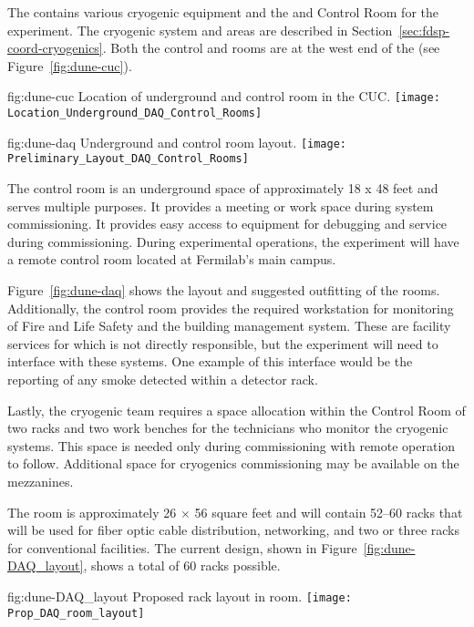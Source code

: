 The  contains various cryogenic equipment and the
 and Control Room for the  experiment.  The
cryogenic system and areas are described in
Section~\ref{sec:fdsp-coord-cryogenics}. Both the control and 
rooms are at the west end of the  (see
Figure~\ref{fig:dune-cuc}).
\begin{dunefigure}{fig:dune-cuc}
  {Location of underground  and control room in the CUC.}
  \texttt{[image: Location\_Underground\_DAQ\_Control\_Rooms]}
\end{dunefigure}
\begin{dunefigure}{fig:dune-daq}
  {Underground  and control room layout.}
  \texttt{[image: Preliminary\_Layout\_DAQ\_Control\_Rooms]}
\end{dunefigure}


The control room is an underground space of approximately 18 x 48 feet
and serves multiple purposes.  It provides a meeting or work space
during system commissioning. It provides easy access to 
equipment for debugging and service during commissioning.  During
experimental operations, the  experiment will have a remote
control room located at Fermilab's main campus.

Figure~\ref{fig:dune-daq} shows the layout and suggested outfitting of
the rooms. Additionally, the control room provides the required
workstation for monitoring of Fire and Life Safety and the building
management system.  These are facility services for which  is not
directly responsible, but the experiment will need to
interface with these systems.  One example of this interface would be
the reporting of any smoke detected within a detector rack.

Lastly, the cryogenic team requires a space allocation within the
Control Room of two racks and two work benches for the technicians who
monitor the cryogenic systems. This space is needed only during
commissioning with remote operation to follow. Additional space for
cryogenics commissioning may be available on the mezzanines.
       
The  room is approximately 26 $\times$ 56 square feet and will
contain 52--60 racks that will be used for fiber optic cable
distribution, networking,   and two or three
racks for conventional facilities.  The current design, shown in
Figure~\ref{fig:dune-DAQ_layout}, shows a total of 60 racks 
possible.
\begin{dunefigure}{fig:dune-DAQ_layout}
  {Proposed rack layout in  room.}
  \texttt{[image: Prop\_DAQ\_room\_layout]}
\end{dunefigure}
  

